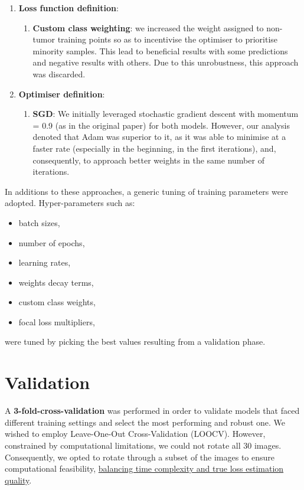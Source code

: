 \begin{enumerate}
        
    \item \textbf{Loss function definition}:
    \begin{enumerate}
        \item \textbf{Custom class weighting}:
        we increased the weight assigned to non-tumor training points so as to incentivise the optimiser to prioritise minority samples.
        This lead to beneficial results with some predictions and negative results with others. Due to this unrobustness, this approach was discarded.
    \end{enumerate}

    \item \textbf{Optimiser definition}:
    \begin{enumerate}
        \item \textbf{SGD}:
        We initially leveraged stochastic gradient descent with momentum = 0.9 (as in the original paper) for both models. However, our analysis denoted that Adam was superior to it, as it was able to minimise at a faster rate (especially in the beginning, in the first iterations), and, consequently, to approach better weights in the same number of iterations.
    \end{enumerate}
    
\end{enumerate}

In additions to these approaches, a generic tuning of training parameters were adopted.
Hyper-parameters such as:
\begin{itemize}
    \item batch sizes,
    \item number of epochs,
    \item learning rates,
    \item weights decay terms,
    \item custom class weights,
    \item focal loss multipliers,
\end{itemize}

were tuned by picking the best values resulting from a validation phase.

\section{Validation}
\label{sec:validation}

\par
A \textbf{3-fold-cross-validation} was performed in order to validate models that faced different training settings and select the most performing and robust one.
We wished to employ Leave-One-Out Cross-Validation (LOOCV). However, constrained by computational limitations, we could not rotate all 30 images. Consequently, we opted to rotate through a subset of the images to ensure computational feasibility, \uline{balancing time complexity and true loss estimation quality}.

